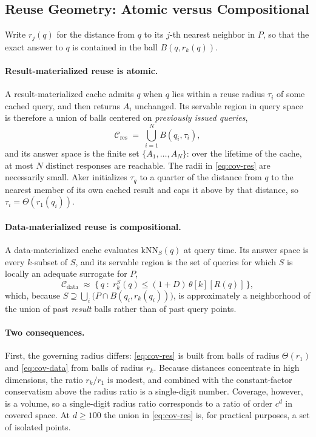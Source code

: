 \subsection{Reuse Geometry: Atomic versus Compositional}
\label{sec:ds-geometry}

Write $r_j(q)$ for the distance from $q$ to its $j$-th nearest neighbor
in $P$, so that the exact answer to $q$ is contained in the ball
$B(q, r_k(q))$.

\paragraph{Result-materialized reuse is atomic.}
A result-materialized cache admits $q$ when $q$ lies within a reuse
radius $\tau_i$ of some cached query, and then returns $A_i$ unchanged.
Its servable region in query space is therefore a union of balls
centered on \emph{previously issued queries},
\begin{equation}
  \mathcal{C}_{\mathrm{res}} \;=\; \bigcup_{i=1}^{N} B(q_i, \tau_i),
  \label{eq:cov-res}
\end{equation}
and its answer space is the finite set $\{A_1,\dots,A_N\}$: over the
lifetime of the cache, at most $N$ distinct responses are reachable.
The radii in \eqref{eq:cov-res} are necessarily small. Aker initializes
$\tau_q$ to a quarter of the distance from $q$ to the nearest member of
its own cached result and caps it above by that distance, so
$\tau_i = \Theta(r_1(q_i))$.

\paragraph{Data-materialized reuse is compositional.}
A data-materialized cache evaluates $\mathrm{kNN}_S(q)$ at query time.
Its answer space is every $k$-subset of $S$, and its servable region is
the set of queries for which $S$ is locally an adequate surrogate for
$P$,
\begin{equation}
  \mathcal{C}_{\mathrm{data}} \;\approx\;
  \bigl\{\, q \;:\; r^{S}_k(q) \le (1{+}D)\,\theta[k][R(q)] \,\bigr\},
  \label{eq:cov-data}
\end{equation}
which, because $S \supseteq \bigcup_i \bigl(P \cap B(q_i, r_k(q_i))\bigr)$,
is approximately a neighborhood of the union of past \emph{result}
balls rather than of past query points.

\paragraph{Two consequences.}
First, the governing radius differs: \eqref{eq:cov-res} is built from
balls of radius $\Theta(r_1)$ and \eqref{eq:cov-data} from balls of
radius $r_k$. Because distances concentrate in high dimensions, the
ratio $r_k/r_1$ is modest, and combined with the constant-factor
conservatism above the radius ratio is a single-digit number. Coverage,
however, is a volume, so a single-digit radius ratio corresponds to a
ratio of order $c^d$ in covered space. At $d \ge 100$ the union in
\eqref{eq:cov-res} is, for practical purposes, a set of isolated
points.


